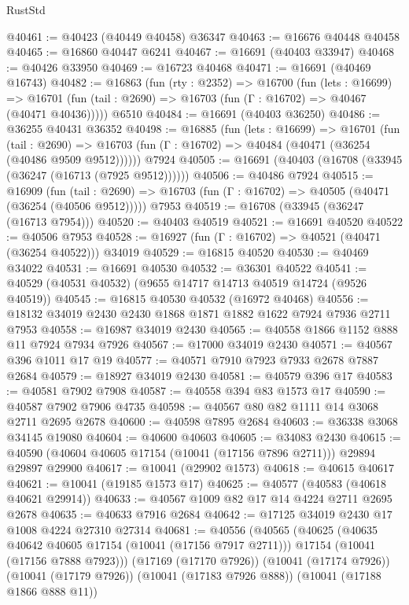 \begin{lexlean}{RustStd}
\begin{coremodule}
@40461 := @40423 (@40449 @40458) @36347
@40463 := @16676 @40448 @40458
@40465 := @16860 @40447 @6241
@40467 := @16691 (@40403 @33947)
@40468 := @40426 @33950
@40469 := @16723 @40468
@40471 := @16691 (@40469 @16743)
@40482 := @16863
    (fun (rty : @2352) =>
    @16700
      (fun (lets : @16699) =>
      @16701 (fun (tail : @2690) => @16703 (fun (Γ : @16702) => @40467 (@40471 @40436)))))
    @6510
@40484 := @16691 (@40403 @36250)
@40486 := @36255 @40431 @36352
@40498 := @16885
    (fun (lets : @16699) =>
    @16701
      (fun (tail : @2690) =>
      @16703 (fun (Γ : @16702) => @40484 (@40471 (@36254 (@40486 @9509 @9512))))))
    @7924
@40505 := @16691 (@40403 (@16708 (@33945 (@36247 (@16713 (@7925 @9512))))))
@40506 := @40486 @7924
@40515 := @16909
    (fun (tail : @2690) => @16703 (fun (Γ : @16702) => @40505 (@40471 (@36254 (@40506 @9512)))))
    @7953
@40519 := @16708 (@33945 (@36247 (@16713 @7954)))
@40520 := @40403 @40519
@40521 := @16691 @40520
@40522 := @40506 @7953
@40528 := @16927 (fun (Γ : @16702) => @40521 (@40471 (@36254 @40522))) @34019
@40529 := @16815 @40520
@40530 := @40469 @34022
@40531 := @16691 @40530
@40532 := @36301 @40522
@40541 := @40529 (@40531 @40532) (@9655 @14717 @14713 @40519 @14724 (@9526 @40519))
@40545 := @16815 @40530 @40532 (@16972 @40468)
@40556 := @18132 @34019 @2430 @2430 @1868 @1871 @1882 @1622 @7924 @7936 @2711 @7953
@40558 := @16987 @34019 @2430
@40565 := @40558 @1866 @1152 @888 @11 @7924 @7934 @7926
@40567 := @17000 @34019 @2430
@40571 := @40567 @396 @1011 @17 @19
@40577 := @40571 @7910 @7923 @7933 @2678 @7887 @2684
@40579 := @18927 @34019 @2430
@40581 := @40579 @396 @17
@40583 := @40581 @7902 @7908
@40587 := @40558 @394 @83 @1573 @17
@40590 := @40587 @7902 @7906 @4735
@40598 := @40567 @80 @82 @1111 @14 @3068 @2711 @2695 @2678
@40600 := @40598 @7895 @2684
@40603 := @36338 @3068 @34145 @19080
@40604 := @40600 @40603
@40605 := @34083 @2430
@40615 := @40590 (@40604 @40605 @17154 (@10041 (@17156 @7896 @2711))) @29894 @29897 @29900
@40617 := @10041 (@29902 @1573)
@40618 := @40615 @40617
@40621 := @10041 (@19185 @1573 @17)
@40625 := @40577 (@40583 (@40618 @40621 @29914))
@40633 := @40567 @1009 @82 @17 @14 @4224 @2711 @2695 @2678
@40635 := @40633 @7916 @2684
@40642 := @17125 @34019 @2430 @17 @1008 @4224 @27310 @27314
@40681 := @40556
    (@40565
      (@40625
        (@40635 @40642 @40605 @17154 (@10041 (@17156 @7917 @2711)))
        @17154
        (@10041 (@17156 @7888 @7923)))
      (@17169 (@17170 @7926))
      (@10041 (@17174 @7926))
      (@10041 (@17179 @7926))
      (@10041 (@17183 @7926 @888))
      (@10041 (@17188 @1866 @888 @11))

\end{coremodule}
\end{lexlean}
